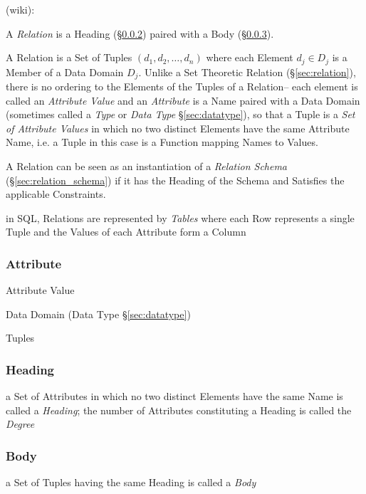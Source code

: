 (wiki):

A \emph{Relation} is a Heading (\S\ref{sec:heading}) paired with a Body
(\S\ref{sec:body}).

A Relation is a Set of Tuples $(d_1, d_2, \ldots, d_n)$ where each Element $d_j
\in D_j$ is a Member of a Data Domain $D_j$. Unlike a Set Theoretic Relation
(\S\ref{sec:relation}), there is no ordering to the Elements of the Tuples of a
Relation-- each element is called an \emph{Attribute Value} and an
\emph{Attribute} is a Name paired with a Data Domain (sometimes called a
\emph{Type} or \emph{Data Type} \S\ref{sec:datatype}), so that a Tuple is a
\emph{Set of Attribute Values} in which no two distinct Elements have the same
Attribute Name, i.e. a Tuple in this case is a Function mapping Names to
Values.

A Relation can be seen as an instantiation of a \emph{Relation Schema}
(\S\ref{sec:relation_schema}) if it has the Heading of the Schema and Satisfies
the applicable Constraints.

in SQL, Relations are represented by \emph{Tables} where each Row represents a
single Tuple and the Values of each Attribute form a Column



\subsubsection{Attribute}\label{sec:database_attribute}

Attribute Value

Data Domain (Data Type \S\ref{sec:datatype})

Tuples



\subsubsection{Heading}\label{sec:heading}

a Set of Attributes in which no two distinct Elements have the same Name is
called a \emph{Heading}; the number of Attributes constituting a Heading is
called the \emph{Degree}



\subsubsection{Body}\label{sec:body}

a Set of Tuples having the same Heading is called a \emph{Body}



